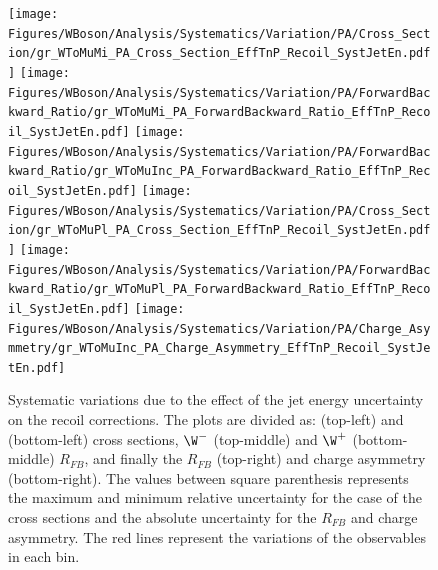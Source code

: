 \begin{figure}[!htbp]
 \begin{center}
  \texttt{[image: Figures/WBoson/Analysis/Systematics/Variation/PA/Cross\_Section/gr\_WToMuMi\_PA\_Cross\_Section\_EffTnP\_Recoil\_SystJetEn.pdf]}
  \texttt{[image: Figures/WBoson/Analysis/Systematics/Variation/PA/ForwardBackward\_Ratio/gr\_WToMuMi\_PA\_ForwardBackward\_Ratio\_EffTnP\_Recoil\_SystJetEn.pdf]}
  \texttt{[image: Figures/WBoson/Analysis/Systematics/Variation/PA/ForwardBackward\_Ratio/gr\_WToMuInc\_PA\_ForwardBackward\_Ratio\_EffTnP\_Recoil\_SystJetEn.pdf]}
  \texttt{[image: Figures/WBoson/Analysis/Systematics/Variation/PA/Cross\_Section/gr\_WToMuPl\_PA\_Cross\_Section\_EffTnP\_Recoil\_SystJetEn.pdf]}
  \texttt{[image: Figures/WBoson/Analysis/Systematics/Variation/PA/ForwardBackward\_Ratio/gr\_WToMuPl\_PA\_ForwardBackward\_Ratio\_EffTnP\_Recoil\_SystJetEn.pdf]}
  \texttt{[image: Figures/WBoson/Analysis/Systematics/Variation/PA/Charge\_Asymmetry/gr\_WToMuInc\_PA\_Charge\_Asymmetry\_EffTnP\_Recoil\_SystJetEn.pdf]}
 \end{center}
 \caption{Systematic variations due to the effect of the jet energy uncertainty on the recoil corrections. The plots are divided as: \WToMuNuMi (top-left) and \WToMuNuPl (bottom-left) cross sections, $\W^{-}$ (top-middle) and $\W^{+}$ (bottom-middle) $R_{FB}$, and finally the \W $R_{FB}$ (top-right) and \W charge asymmetry (bottom-right). The values between square parenthesis represents the maximum and minimum relative uncertainty for the case of the cross sections and the absolute uncertainty for the $R_{FB}$ and charge asymmetry. The red lines represent the variations of the observables in each bin.}
 \label{fig:Recoil_SystJetEn}
\end{figure}


